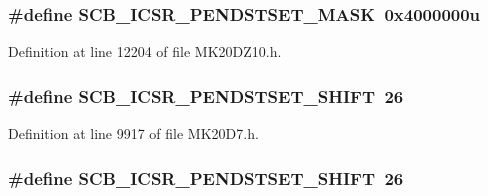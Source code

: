 \subsubsection[{\texorpdfstring{S\+C\+B\+\_\+\+I\+C\+S\+R\+\_\+\+P\+E\+N\+D\+S\+T\+S\+E\+T\+\_\+\+M\+A\+SK}{SCB_ICSR_PENDSTSET_MASK}}]{\setlength{\rightskip}{0pt plus 5cm}\#define S\+C\+B\+\_\+\+I\+C\+S\+R\+\_\+\+P\+E\+N\+D\+S\+T\+S\+E\+T\+\_\+\+M\+A\+SK~0x4000000u}\hypertarget{group___s_c_b___register___masks_gaec656bf7e4d2fdcacfe0ef3e16397a04}{}\label{group___s_c_b___register___masks_gaec656bf7e4d2fdcacfe0ef3e16397a04}


Definition at line 12204 of file M\+K20\+D\+Z10.\+h.

\subsubsection[{\texorpdfstring{S\+C\+B\+\_\+\+I\+C\+S\+R\+\_\+\+P\+E\+N\+D\+S\+T\+S\+E\+T\+\_\+\+S\+H\+I\+FT}{SCB_ICSR_PENDSTSET_SHIFT}}]{\setlength{\rightskip}{0pt plus 5cm}\#define S\+C\+B\+\_\+\+I\+C\+S\+R\+\_\+\+P\+E\+N\+D\+S\+T\+S\+E\+T\+\_\+\+S\+H\+I\+FT~26}\hypertarget{group___s_c_b___register___masks_ga048d1683c88c61f80f5c80173bf5e981}{}\label{group___s_c_b___register___masks_ga048d1683c88c61f80f5c80173bf5e981}


Definition at line 9917 of file M\+K20\+D7.\+h.

\subsubsection[{\texorpdfstring{S\+C\+B\+\_\+\+I\+C\+S\+R\+\_\+\+P\+E\+N\+D\+S\+T\+S\+E\+T\+\_\+\+S\+H\+I\+FT}{SCB_ICSR_PENDSTSET_SHIFT}}]{\setlength{\rightskip}{0pt plus 5cm}\#define S\+C\+B\+\_\+\+I\+C\+S\+R\+\_\+\+P\+E\+N\+D\+S\+T\+S\+E\+T\+\_\+\+S\+H\+I\+FT~26}\hypertarget{group___s_c_b___register___masks_ga048d1683c88c61f80f5c80173bf5e981}{}\label{group___s_c_b___register___masks_ga048d1683c88c61f80f5c80173bf5e981}


